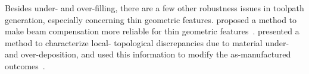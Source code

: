  \citeauthor{Jin2017}

Besides under- and over-filling, there are a few other robustness issues in toolpath generation, especially concerning thin geometric features.
\citeauthor{Moesen2011} proposed a method to make beam compensation more reliable for thin geometric features~\cite{Moesen2011}.
\citeauthor{Behandish2019a} presented a method to characterize local- topological discrepancies due to material under- and over-deposition, and used this information to modify the as-manufactured outcomes~\cite{Behandish2019a}.












